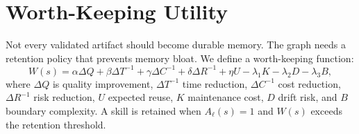 \documentclass[10.5pt,oneside]{article}
\begin{document}
\section{Worth-Keeping Utility}
Not every validated artifact should become durable memory. The graph needs a retention policy that prevents memory bloat. We define a worth-keeping function:
\[
  W(s) = \alpha \Delta Q + \beta \Delta T^{-1} + \gamma \Delta C^{-1} + \delta \Delta R^{-1} + \eta U - \lambda_1 K - \lambda_2 D - \lambda_3 B,
\]
where \(\Delta Q\) is quality improvement, \(\Delta T^{-1}\) time reduction, \(\Delta C^{-1}\) cost reduction, \(\Delta R^{-1}\) risk reduction, \(U\) expected reuse, \(K\) maintenance cost, \(D\) drift risk, and \(B\) boundary complexity. A skill is retained when \(A_\ell(s)=1\) and \(W(s)\) exceeds the retention threshold.
\end{document}
